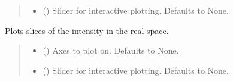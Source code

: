 \documentclass[letterpaper,10pt,english]{sphinxmanual}
\begin{document}
\begin{fulllineitems}
\begin{fulllineitems}
\begin{quote}
\begin{description}
\begin{itemize}
\item {} 
\sphinxAtStartPar
{} (\sphinxstyleliteralemphasis{\sphinxupquote{, }}) \textendash{} Slider for interactive plotting. Defaults to None.

\end{itemize}

\end{description}\end{quote}

\end{fulllineitems}


\begin{fulllineitems}
\label{\detokenize{source/Box:Box.Box.plot_intensity_slices}}
\pysigstartsignatures
\pysiglinewithargsret
{}
{\sphinxparamcomma {}}
{}
\pysigstopsignatures
\sphinxAtStartPar
Plots slices of the intensity in the real space.
\begin{quote}\begin{description}
\begin{itemize}
\item {} 
\sphinxAtStartPar
{} (\sphinxstyleliteralemphasis{\sphinxupquote{, }}) \textendash{} Axes to plot on. Defaults to None.

\item {} 
\sphinxAtStartPar
{} (\sphinxstyleliteralemphasis{\sphinxupquote{, }}) \textendash{} Slider for interactive plotting. Defaults to None.

\end{itemize}

\end{description}\end{quote}


\end{fulllineitems}
\end{fulllineitems}
\end{document}
